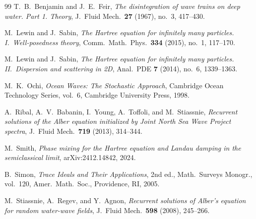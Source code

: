 \documentclass[11pt]{amsart}
\theoremstyle{definition}
\begin{document}
\begin{thebibliography}{99}
T.~B.~Benjamin and J.~E.~Feir, \emph{The disintegration of wave trains on deep water. Part 1. Theory}, J.\ Fluid Mech.\ \textbf{27} (1967), no.~3, 417--430.




M.~Lewin and J.~Sabin, \emph{The Hartree equation for infinitely many particles. I.\ Well-posedness theory}, Comm.\ Math.\ Phys.\ \textbf{334} (2015), no.~1, 117--170.

M.~Lewin and J.~Sabin,
\emph{The Hartree equation for infinitely many particles.
II.\ Dispersion and scattering in 2D},
Anal.\ PDE \textbf{7} (2014), no.~6, 1339--1363.

M.~K.~Ochi, \emph{Ocean Waves: The Stochastic Approach}, Cambridge Ocean Technology Series, vol.~6, Cambridge University Press, 1998.

A.~Ribal, A.~V.~Babanin, I.~Young, A.~Toffoli, and M.~Stiassnie, \emph{Recurrent solutions of the Alber equation initialized by Joint North Sea Wave Project spectra}, J.\ Fluid Mech.\ \textbf{719} (2013), 314--344.

M.~Smith, \emph{Phase mixing for the Hartree equation and Landau damping in the semiclassical limit}, arXiv:2412.14842, 2024.


B.~Simon, \emph{Trace Ideals and Their Applications}, 2nd ed., Math.\ Surveys Monogr., vol.~120, Amer.\ Math.\ Soc., Providence, RI, 2005.

M.~Stiassnie, A.~Regev, and Y.~Agnon, \emph{Recurrent solutions of Alber's equation for random water-wave fields}, J.\ Fluid Mech.\ \textbf{598} (2008), 245--266.


\end{thebibliography}
\end{document}
